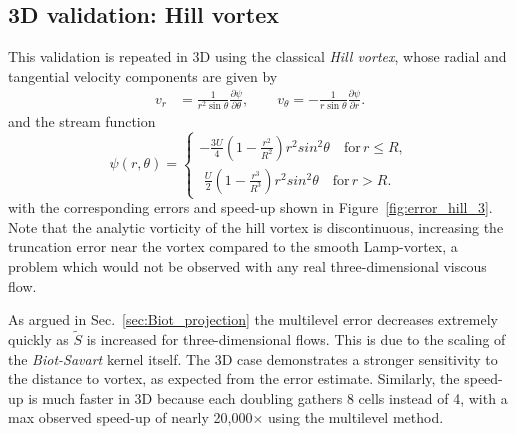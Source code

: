 \documentclass[preprint,12pt]{elsarticle}
\begin{document}
\subsection{3D validation: Hill vortex}

This validation is repeated in 3D using the classical \emph{Hill vortex}, whose radial and tangential velocity components are given by
\begin{align}
    v_r &= \frac{1}{r^2\sin\theta}\frac{\partial\psi}{\partial\theta}, \qquad v_\theta = -\frac{1}{r\sin\theta}\frac{\partial\psi}{\partial r}.
\end{align}
and the stream function 
\begin{equation}
    \psi(r,\theta) = \begin{cases}
    -\frac{3U}{4}\left(1-\frac{r^2}{R^2}\right)r^2sin^2\theta \quad \text{for} \, r \le R,\\
     \,\,\frac{U}{2}\left(1-\frac{r^3}{R^3}\right)r^2sin^2\theta \quad \text{for} \, r > R.
    \end{cases}
\end{equation}
with the corresponding errors and speed-up shown in Figure~\ref{fig:error_hill_3}. Note that the analytic vorticity of the hill vortex is discontinuous, increasing the truncation error near the vortex compared to the smooth Lamp-vortex, a problem which would not be observed with any real three-dimensional viscous flow.

As argued in Sec.~\ref{sec:Biot_projection} the multilevel error decreases extremely quickly as $\tilde{S}$ is increased for three-dimensional flows. This is due to the scaling of the \emph{Biot-Savart} kernel itself. The 3D case demonstrates a stronger sensitivity to the distance to vortex, as expected from the error estimate. Similarly, the speed-up is much faster in 3D because each doubling gathers 8 cells instead of 4, with a max observed speed-up of nearly 20,000$\times$ using the multilevel method.
\end{document}
